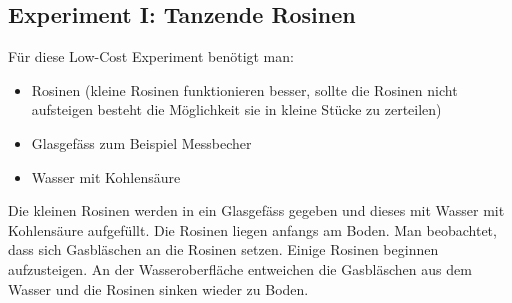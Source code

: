 \subsection*{Experiment I: Tanzende Rosinen}
Für diese Low-Cost Experiment benötigt man:
\begin{itemize}
	\item Rosinen (kleine Rosinen funktionieren besser, sollte die Rosinen nicht aufsteigen besteht die Möglichkeit sie in kleine Stücke zu zerteilen)
	\item Glasgefäss zum Beispiel Messbecher
	\item Wasser mit Kohlensäure
\end{itemize}
Die kleinen Rosinen werden in ein Glasgefäss gegeben und dieses mit Wasser mit Kohlensäure aufgefüllt.
Die Rosinen liegen anfangs am Boden. Man beobachtet, dass sich Gasbläschen an die Rosinen setzen.
Einige Rosinen beginnen aufzusteigen. An der Wasseroberfläche entweichen die Gasbläschen aus dem Wasser und die Rosinen sinken wieder zu Boden.
